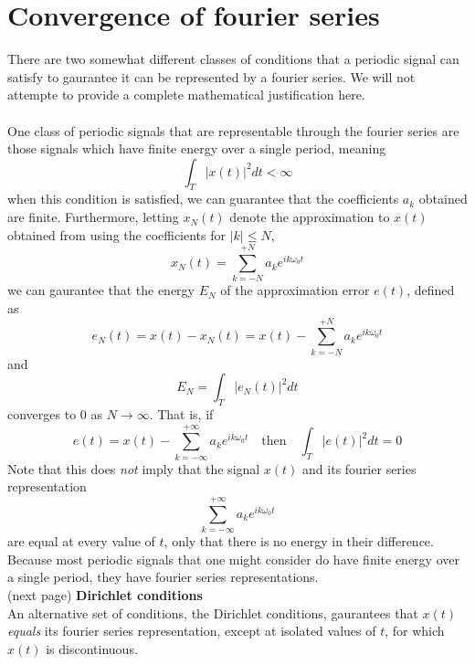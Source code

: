 \documentclass{report}
\begin{document}
\section{Convergence of fourier series}
There are two somewhat different classes of conditions that a periodic signal can satisfy to gaurantee it can be represented by a fourier series. We will not attempte to provide a complete mathematical
justification here.\\
\vspace{1mm}\\
One class of periodic signals that are representable through the fourier series are those signals which have finite energy over a single period, meaning
\begin{equation*}
\int_T|x(t)|^2dt<\infty
\end{equation*}
when this condition is satisfied, we can guarantee that the coefficients $a_k$ obtained are finite. Furthermore, letting $x_N(t)$ denote the approximation to $x(t)$ obtained from
using the coefficients for $|k|\leq N$,
\begin{equation*}
x_N(t)=\sum^{+N}_{k=-N}a_ke^{ik\omega_0t}
\end{equation*}
we can gaurantee that the energy $E_N$ of the approximation error $e(t)$, defined as
\begin{equation*}
e_N(t)=x(t)-x_N(t)=x(t)-\sum^{+N}_{k=-N}a_ke^{ik\omega_0t}
\end{equation*}
and
\begin{equation*}
E_N=\int_T|e_N(t)|^2dt
\end{equation*}
converges to 0 as $N\to\infty$. That is, if
\begin{equation*}
e(t)=x(t)-\sum^{+\infty}_{k=-\infty}a_ke^{ik\omega_0t}\quad\text{then}\quad\int_T|e(t)|^2dt=0
\end{equation*}
Note that this does \textit{not} imply that the signal $x(t)$ and its fourier series representation
\begin{equation*}
\sum^{+\infty}_{k=-\infty}a_ke^{ik\omega_0t}
\end{equation*}
are equal at every value of $t$, only that there is no energy in their difference. Because most periodic signals that one might consider do have finite energy over a single period, they have
fourier series representations.\\
(next page)\newpage
\noindent\textbf{Dirichlet conditions}\\
An alternative set of conditions, the Dirichlet conditions, gaurantees that $x(t)$ \textit{equals} its fourier series representation, except at isolated values of $t$, for which $x(t)$ is discontinuous.
\end{document}
